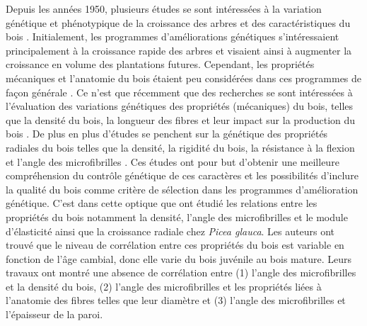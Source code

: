 \documentclass{report}
\begin{document}
Depuis les années 1950, plusieurs études se sont intéressées à la variation génétique et phénotypique de la croissance des arbres et des caractéristiques du bois \citep{Corriveau1971,Li1993,Li1997}. Initialement, les programmes d'améliorations génétiques s'intéressaient principalement à la croissance rapide des arbres et visaient ainsi à augmenter la croissance en volume des plantations futures. Cependant, les  propriétés mécaniques et l'anatomie du bois étaient peu considérées dans ces programmes de façon générale \citep{Zhang1995}. Ce n'est que récemment que des recherches se sont intéressées à l'évaluation des variations génétiques des propriétés (mécaniques) du bois, telles que la densité du bois, la longueur des fibres et leur impact sur la production du bois \citep{Hernandez2001,Beaulieu2003}. De plus en plus d'études se penchent sur la génétique des propriétés radiales du bois telles que la densité, la rigidité du bois, la résistance à la flexion et l'angle des microfibrilles \citep{Lenz2010,McLean2016}. Ces études ont pour but d'obtenir une meilleure compréhension du contrôle génétique de ces caractères et les possibilités d'inclure la qualité du bois comme critère de sélection dans les programmes d'amélioration génétique. C'est dans cette optique que \cite{Lenz2011} ont étudié les relations entre les propriétés du bois notamment la densité, l'angle des microfibrilles et le module d'élasticité ainsi que la croissance radiale chez \textit{Picea glauca}. Les auteurs ont trouvé que le niveau de corrélation entre ces propriétés du bois est variable en fonction de l'âge cambial, donc elle varie du bois juvénile au bois mature. Leurs travaux ont montré une absence de corrélation entre (1) l'angle des microfibrilles et la densité du bois, (2) l'angle des microfibrilles et les propriétés liées à l'anatomie des fibres telles que leur diamètre et (3) l'angle des microfibrilles et l'épaisseur de la paroi. \\ 
\end{document}
